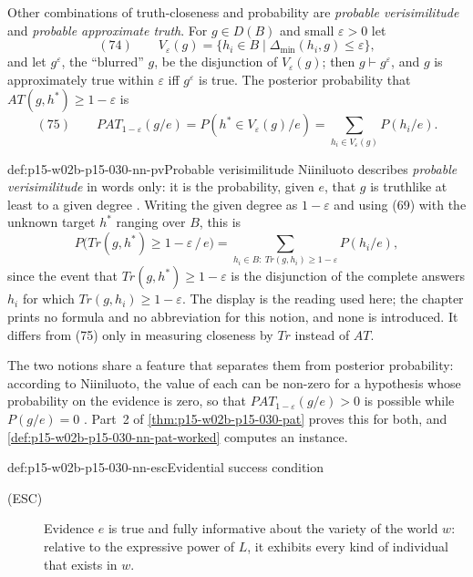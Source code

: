 Other combinations of truth-closeness and probability are \emph{probable
verisimilitude} and \emph{probable approximate truth}. For \(g\in D(B)\) and
small \(\varepsilon>0\) let
\[
 (74)\qquad V_\varepsilon(g)=\{h_i\in B\mid\Delta_{\min}(h_i,g)\leq\varepsilon\},
\]
and let \(g^\varepsilon\), the ``blurred'' \(g\), be the disjunction of
\(V_\varepsilon(g)\); then \(g\vdash g^\varepsilon\), and \(g\) is approximately true
within \(\varepsilon\) iff \(g^\varepsilon\) is true. The posterior probability that
\(AT(g,h^*)\geq1-\varepsilon\) is
\[
 (75)\qquad PAT_{1-\varepsilon}(g/e)=P(h^*\in V_\varepsilon(g)/e)=\sum_{h_i\in V_\varepsilon(g)}P(h_i/e).
\]
\cite[pp.~346--347]{Niiniluoto2011HintikkaProgramReading}

\begin{hbdefinition}{def:p15-w02b-p15-030-nn-pv}{Probable verisimilitude}
Niiniluoto describes \emph{probable verisimilitude} in words only: it is
the probability, given \(e\), that \(g\) is truthlike at least to a given
degree \cite[p.~346]{Niiniluoto2011HintikkaProgramReading}. Writing the
given degree as \(1-\varepsilon\) and using (69) with the unknown target
\(h^*\) ranging over \(B\), this is
\[
 P\bigl(Tr(g,h^*)\geq1-\varepsilon\,/\,e\bigr)
 =\sum_{h_i\in B:\ Tr(g,h_i)\geq1-\varepsilon}P(h_i/e),
\]
since the event that \(Tr(g,h^*)\geq1-\varepsilon\) is the disjunction of the
complete answers \(h_i\) for which \(Tr(g,h_i)\geq1-\varepsilon\). The display is
the reading used here; the chapter prints no formula and no abbreviation
for this notion, and none is introduced. It differs from (75) only in
measuring closeness by \(Tr\) instead of \(AT\).
\end{hbdefinition}

The two notions share a feature that separates them from posterior
probability: according to Niiniluoto, the value of each can be non-zero
for a hypothesis whose probability on the evidence is zero, so that
\(PAT_{1-\varepsilon}(g/e)>0\) is possible while \(P(g/e)=0\)
\cite[p.~347]{Niiniluoto2011HintikkaProgramReading}. Part~2 of
\cref{thm:p15-w02b-p15-030-pat} proves this for both, and
\cref{def:p15-w02b-p15-030-nn-pat-worked} computes an instance.

\begin{hbdefinition}{def:p15-w02b-p15-030-nn-esc}{Evidential success condition}
\begin{description}
\item[(ESC)] Evidence \(e\) is true and fully informative about the variety
  of the world \(w\): relative to the expressive power of \(L\), it exhibits
  every kind of individual that exists in \(w\).
\end{description}
\cite[p.~347]{Niiniluoto2011HintikkaProgramReading}
\end{hbdefinition}

